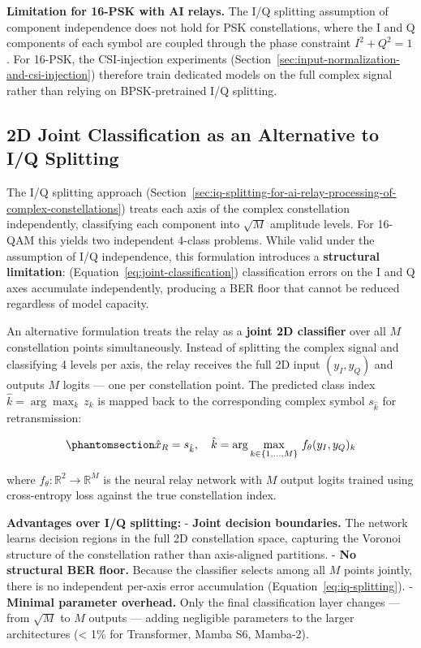 \textbf{Limitation for 16-PSK with AI relays.} The I/Q splitting assumption of component independence does not hold for PSK constellations, where the I and Q components of each symbol are coupled through the phase constraint \(I^2 + Q^2 = 1\). For 16-PSK, the CSI-injection experiments (Section~\ref{sec:input-normalization-and-csi-injection}) therefore train dedicated models on the full complex signal rather than relying on BPSK-pretrained I/Q splitting.

\subsection{2D Joint Classification as an Alternative to I/Q Splitting}\label{sec:d-joint-classification-as-an-alternative-to-iq-splitting}

The I/Q splitting approach (Section~\ref{sec:iq-splitting-for-ai-relay-processing-of-complex-constellations}) treats each axis of the complex constellation independently, classifying each component into \(\sqrt{M}\) amplitude levels. For 16-QAM this yields two independent 4-class problems. While valid under the assumption of I/Q independence, this formulation introduces a \textbf{structural limitation}: (Equation~\ref{eq:joint-classification}) classification errors on the I and Q axes accumulate independently, producing a BER floor that cannot be reduced regardless of model capacity.

An alternative formulation treats the relay as a \textbf{joint 2D classifier} over all \(M\) constellation points simultaneously. Instead of splitting the complex signal and classifying 4 levels per axis, the relay receives the full 2D input \((y_I, y_Q)\) and outputs \(M\) logits --- one per constellation point. The predicted class index \(\hat{k} = \arg\max_k \, z_k\) is mapped back to the corresponding complex symbol \(s_{\hat{k}}\) for retransmission:

\begin{equation}\protect\phantomsection\label{eq:joint-classification}{\hat{x}_R = s_{\hat{k}}, \quad \hat{k} = \arg\max_{k \in \{1, \dots, M\}} \, f_\theta(y_I, y_Q)_k
}\end{equation}

where \(f_\theta : \mathbb{R}^2 \to \mathbb{R}^M\) is the neural relay network with \(M\) output logits trained using cross-entropy loss against the true constellation index.

\textbf{Advantages over I/Q splitting:} - \textbf{Joint decision boundaries.} The network learns decision regions in the full 2D constellation space, capturing the Voronoi structure of the constellation rather than axis-aligned partitions. - \textbf{No structural BER floor.} Because the classifier selects among all \(M\) points jointly, there is no independent per-axis error accumulation (Equation~\ref{eq:iq-splitting}). - \textbf{Minimal parameter overhead.} Only the final classification layer changes --- from \(\sqrt{M}\) to \(M\) outputs --- adding negligible parameters to the larger architectures (\textless{} 1\% for Transformer, Mamba S6, Mamba-2).

